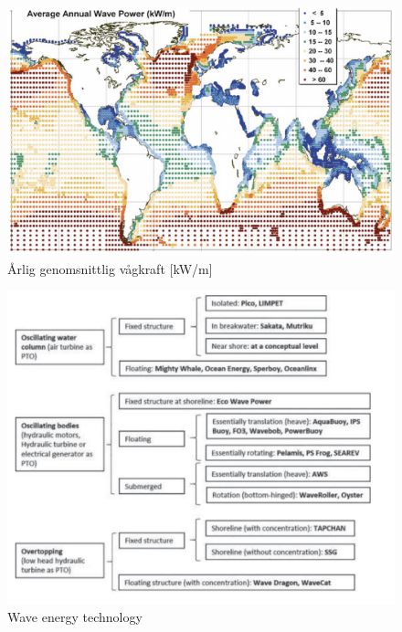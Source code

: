 \documentclass[10pt,a4paper,oneside]{article}
\begin{document}



\begin{figure}
\label{Globalmean}
	\includegraphics[scale=0.6]{globalmean.png}
	\caption{\r{A}rlig genomsnittlig v\r{a}gkraft [kW/m]}
\end{figure}

\begin{figure}
\label{Technologies}
	\includegraphics[scale=0.6]{Technologies.png}
	\caption{Wave energy technology}
\end{figure}
\end{document}
